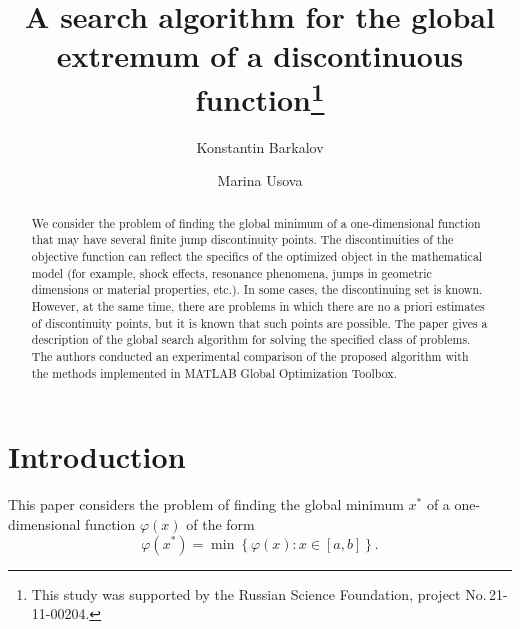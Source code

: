 \documentclass[runningheads]{llncs}
\begin{document}
%
\title{A search algorithm for the global extremum \break of a discontinuous function\thanks{This study was supported by the Russian Science Foundation, project No.\,21-11-00204.}}
%
%
\author{Konstantin Barkalov   
\and Marina Usova 
}
%
%
%
\maketitle              %
%
\begin{abstract}
We consider the problem of finding the global minimum of a one-dimensional function that may have several finite jump discontinuity points. The discontinuities of the objective function can reflect the specifics of the optimized object in the mathematical model (for example, shock effects, resonance phenomena, jumps in geometric dimensions or material properties, etc.). In some cases, the discontinuing set is known. However, at the same time, there are problems in which there are no a priori estimates of discontinuity points, but it is known that such points are possible. The paper gives a description of the global search algorithm for solving the specified class of problems. The authors conducted an experimental comparison of the proposed algorithm with the methods implemented in MATLAB Global Optimization Toolbox.


\end{abstract}
%
%
%
\section{Introduction}

This paper considers the problem of finding the global minimum $x^*$ of a one-dimensional function $\varphi(x)$ of the form 
\begin{equation}\label{problem}
\varphi(x^*)=\min\left\{\varphi(x):x\in\left[a,b\right]\right\}.
\end{equation}
\end{document}
